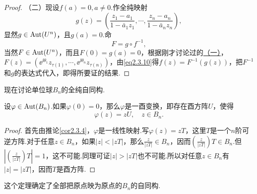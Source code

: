 \begin{proof}
	（二）\hypertarget{2.3.7}{}\quad 现设$f(a)=0,a\neq0$.作全纯映射
	\[g(z)=\left(\frac{z_1-a_1}{1-\bar{a}_1z_1},\cdots,\frac{z_n-a_n}{1-\bar{a}_n z_n}\right),\]
	显然$g\in\operatorname{Aut}(U^n)$，且$g(a)=0$.命
	\begin{equation}\label{eq2.3.10}
		F=g\circ f^{-1},
	\end{equation}
当然$F\in\operatorname{Aut}(U^n)$，而且$F(0)=g(a)=0$，根据刚才讨论过的\hyperlink{2.3.7}{（一）}，$F(z)=(\ee^{\ii\theta_1}z_{\tau(1)},\cdots,\ee^{\ii\theta_n}z_{\tau(n)})$，由\eqref{eq2.3.10}得$f(z)=F^{-1}(g(z))$，把$F^{-1}$和$g$的表达式代入，即得所要证的结果.
\end{proof}
现在讨论单位球$B_n$的全纯自同构.
\begin{theorem}\label{thm2.3.8}
	设$\varphi\in\operatorname{Aut}(B_n)$.如果$\varphi(0)=0$，那么$\varphi$是一酉变换，即存在酉方阵$U$，使得
	\[\varphi(z)=zU,\quad z\in B_n.\]
\end{theorem}
\begin{proof}
	首先由推论\ref{cor2.3.4}，$\varphi$是一线性映射.写$\varphi(z)=zT$，这里$T$是一个$n$阶可逆方阵.对于任意$z\in B_n$，如果$|z|<|zT|$，那么$\frac{z}{|zT|}\in B_n$，因而$\left(\frac{z}{|zT|}\right)T\in B_n$.但$\left|\left(\frac{z}{|zT|}\right)T\right|=1$，这不可能.同理可证$|z|>|zT|$也不可能.所以对任意$z\in B_n$有$|z|=|zT|$，因而$T$是酉方阵.
\end{proof}
这个定理确定了全部把原点映为原点的$B_n$的自同构.

